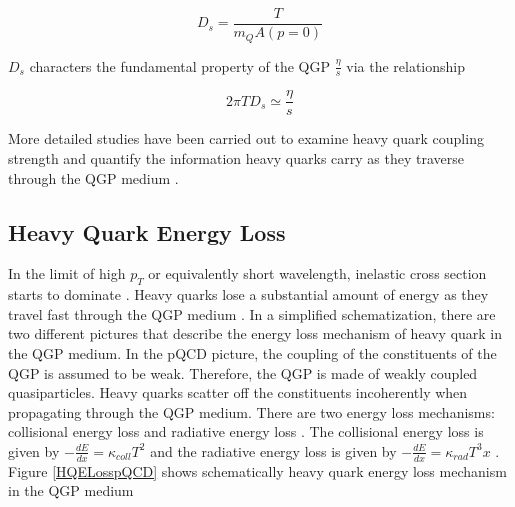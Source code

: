 \begin{equation}
D_s = \frac{T} {m_Q A(p=0)}
\end{equation}

$D_s$ characters the fundamental property of the QGP $\frac{\eta}{s}$ via the relationship 

\begin{equation}
2 \pi T D_s \simeq \frac{\eta}{s}
\end{equation}

More detailed studies have been carried out to examine heavy quark coupling strength and quantify the information heavy quarks carry as they traverse through the QGP medium \cite{HQJamie}.


\subsection{Heavy Quark Energy Loss}

In the limit of high $p_T$ or equivalently short wavelength, inelastic cross section starts to dominate \cite{HQReview}. Heavy quarks lose a substantial amount of energy as they travel fast through the QGP medium \cite{HQELossFirst}. In a simplified schematization, there are two different pictures that describe the energy loss mechanism of heavy quark in the QGP medium. In the pQCD picture, the coupling of the constituents of the QGP is assumed to be weak. Therefore, the QGP is made of weakly coupled quasiparticles. Heavy quarks scatter off the constituents incoherently when propagating through the QGP medium. There are two energy loss mechanisms: collisional energy loss and radiative energy loss \cite{HQRaff}. The collisional energy loss is given by $-\frac{dE}{dx} = \kappa_{coll}T^2$ and the radiative energy loss is given by  $-\frac{dE}{dx} = \kappa_{rad}T^3x$ \cite{HQCollELoss,HQRadELoss}. Figure \ref{HQELosspQCD} shows schematically heavy quark energy loss mechanism in the QGP medium



